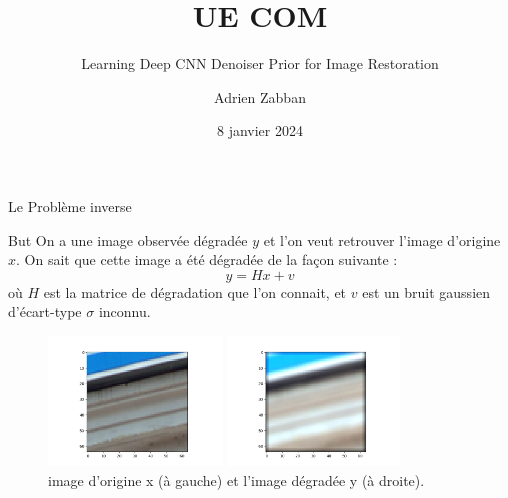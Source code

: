\documentclass[11pt]{beamer}
\title{UE COM}
\subtitle{Learning Deep CNN Denoiser Prior for Image Restoration}
\author{Adrien Zabban}
\date{8 janvier 2024}
\begin{document}
\maketitle

\begin{frame}{Le Problème inverse}
    \begin{block}{But}
        On a une image observée dégradée $y$ et l'on veut retrouver l'image d'origine $x$. On sait 
        que cette image a été dégradée de la façon suivante : 
        $$y = Hx + v$$
        où $H$ est la matrice de 
        dégradation que l'on connait, et $v$ est un bruit gaussien d'écart-type $\sigma$ inconnu.
    \end{block}
    \begin{figure}[b]
        \centering
        \includegraphics[width=0.41\textwidth]{../debluring/x.png}
        \hspace{1cm}
        \includegraphics[width=0.41\textwidth]{../debluring/y.png}
        \caption{image d'origine x (à gauche) et l'image dégradée y (à droite).}
    \end{figure}
\end{frame}
\end{document}
